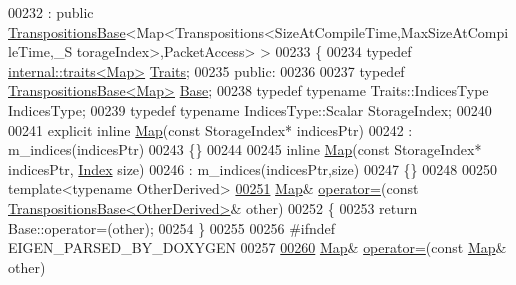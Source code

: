 \begin{DoxyCode}
00232  : \textcolor{keyword}{public} \hyperlink{class_eigen_1_1_transpositions_base}{TranspositionsBase}<Map<Transpositions<SizeAtCompileTime,MaxSizeAtCompileTime,\_S
      torageIndex>,PacketAccess> >
00233 \{
00234     \textcolor{keyword}{typedef} \hyperlink{struct_eigen_1_1internal_1_1traits}{internal::traits<Map>} \hyperlink{struct_eigen_1_1internal_1_1traits}{Traits};
00235   \textcolor{keyword}{public}:
00236 
00237     \textcolor{keyword}{typedef} \hyperlink{class_eigen_1_1_transpositions_base}{TranspositionsBase<Map>} \hyperlink{class_eigen_1_1_transpositions_base}{Base};
00238     \textcolor{keyword}{typedef} \textcolor{keyword}{typename} Traits::IndicesType IndicesType;
00239     \textcolor{keyword}{typedef} \textcolor{keyword}{typename} IndicesType::Scalar StorageIndex;
00240 
00241     \textcolor{keyword}{explicit} \textcolor{keyword}{inline} \hyperlink{group___core___module_class_eigen_1_1_map}{Map}(\textcolor{keyword}{const} StorageIndex* indicesPtr)
00242       : m\_indices(indicesPtr)
00243     \{\}
00244 
00245     \textcolor{keyword}{inline} \hyperlink{group___core___module_class_eigen_1_1_map}{Map}(\textcolor{keyword}{const} StorageIndex* indicesPtr, \hyperlink{class_eigen_1_1_transpositions_base_a3f5f06118b419e8e6ccbe49ed5b4c91f}{Index} size)
00246       : m\_indices(indicesPtr,size)
00247     \{\}
00248 
00250     \textcolor{keyword}{template}<\textcolor{keyword}{typename} OtherDerived>
\hyperlink{class_eigen_1_1_map_3_01_transpositions_3_01_size_at_compile_time_00_01_max_size_at_compile_timecc993082d7c0ba51ca94b27e97da8dd3_a903d189a8b363033ec9b1cba0190b11b}{00251}     \hyperlink{group___core___module_class_eigen_1_1_map}{Map}& \hyperlink{class_eigen_1_1_map_3_01_transpositions_3_01_size_at_compile_time_00_01_max_size_at_compile_timecc993082d7c0ba51ca94b27e97da8dd3_a903d189a8b363033ec9b1cba0190b11b}{operator=}(\textcolor{keyword}{const} \hyperlink{class_eigen_1_1_transpositions_base}{TranspositionsBase<OtherDerived>}& 
      other)
00252     \{
00253       \textcolor{keywordflow}{return} Base::operator=(other);
00254     \}
00255 
00256 \textcolor{preprocessor}{    #ifndef EIGEN\_PARSED\_BY\_DOXYGEN}
00257 
\hyperlink{class_eigen_1_1_map_3_01_transpositions_3_01_size_at_compile_time_00_01_max_size_at_compile_timecc993082d7c0ba51ca94b27e97da8dd3_aaafbdb07fbd22f5ac9171e6b03d783f4}{00260}     \hyperlink{group___core___module_class_eigen_1_1_map}{Map}& \hyperlink{class_eigen_1_1_map_3_01_transpositions_3_01_size_at_compile_time_00_01_max_size_at_compile_timecc993082d7c0ba51ca94b27e97da8dd3_aaafbdb07fbd22f5ac9171e6b03d783f4}{operator=}(\textcolor{keyword}{const} \hyperlink{group___core___module_class_eigen_1_1_map}{Map}& other)

\end{DoxyCode}
